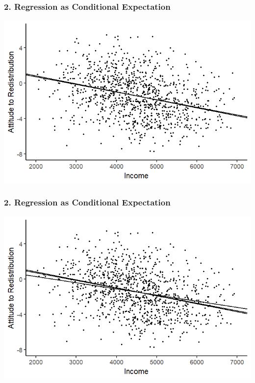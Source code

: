 \documentclass[xcolor=x11names,compress]{beamer}\usepackage[]{graphicx}\usepackage[]{color}
\makeatletter
\def\maxwidth{ %
  \ifdim\Gin@nat@width>\linewidth
    \linewidth
  \else
    \Gin@nat@width
  \fi
}
\newenvironment{knitrout}{}{} %
\renewcommand{\(}{\begin{columns}}
\renewcommand{\)}{\end{columns}}
\newcommand{\<}[1]{\begin{column}{#1}}
\renewcommand{\>}{\end{column}}
\makeatother
\begin{document}
\begin{frame}
\frametitle{2. Regression as Conditional Expectation}
\begin{knitrout}
\color{fgcolor}
\includegraphics[width=\maxwidth]{figure/cond_exp1e-1} 

\end{knitrout}
\end{frame}

\begin{frame}
\frametitle{2. Regression as Conditional Expectation}
\begin{knitrout}
\color{fgcolor}
\includegraphics[width=\maxwidth]{figure/cond_exp1f-1} 

\end{knitrout}
\end{frame}
\end{document}
